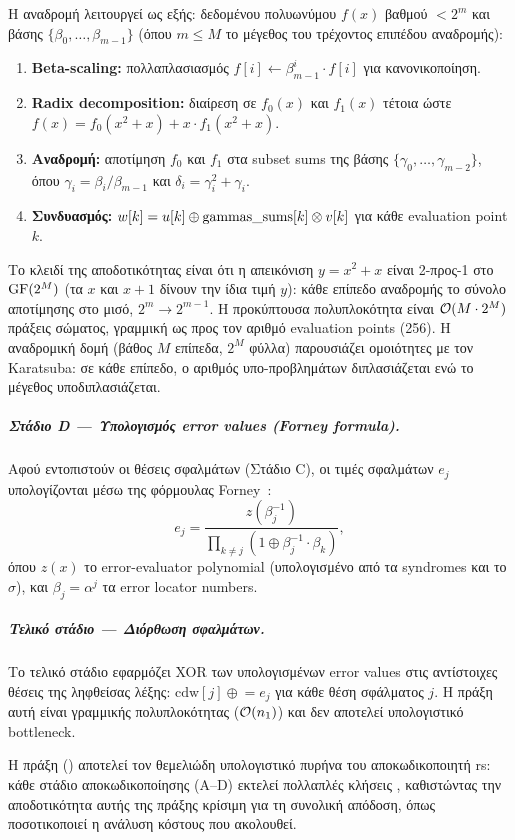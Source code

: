 Η αναδρομή λειτουργεί ως εξής: δεδομένου πολυωνύμου $f(x)$ βαθμού $< 2^m$
και βάσης $\{\beta_0, \ldots, \beta_{m-1}\}$ (όπου $m \leq M$ το μέγεθος του τρέχοντος επιπέδου αναδρομής):
\begin{enumerate}
  \item \textbf{Beta-scaling:} πολλαπλασιασμός $f[i] \leftarrow
    \beta_{m-1}^i \cdot f[i]$ για κανονικοποίηση.
  \item \textbf{Radix decomposition:} διαίρεση σε $f_0(x)$ και $f_1(x)$
    τέτοια ώστε $f(x) = f_0(x^2 + x) + x \cdot f_1(x^2 + x)$.
  \item \textbf{Αναδρομή:} αποτίμηση $f_0$ και $f_1$ στα subset sums
    της βάσης $\{\gamma_0, \ldots, \gamma_{m-2}\}$, όπου
    $\gamma_i = \beta_i / \beta_{m-1}$ και $\delta_i = \gamma_i^2 + \gamma_i$.
  \item \textbf{Συνδυασμός:} $w[k] = u[k] \oplus \text{gammas\_sums}[k] \otimes v[k]$
    για κάθε evaluation point $k$.
\end{enumerate}
Το κλειδί της αποδοτικότητας είναι ότι η απεικόνιση $y = x^2 + x$ είναι 2-προς-1 στο $\mathrm{GF}(2^M)$ (τα $x$ και $x{+}1$ δίνουν την ίδια τιμή $y$): κάθε επίπεδο αναδρομής  το σύνολο αποτίμησης στο μισό, $2^m \to 2^{m-1}$.
Η προκύπτουσα πολυπλοκότητα είναι $\mathcal{O}(M \cdot 2^M)$ πράξεις σώματος, γραμμική ως
προς τον αριθμό evaluation points (256).
Η αναδρομική δομή (βάθος $M$ επίπεδα, $2^M$ φύλλα) παρουσιάζει ομοιότητες
με τον Karatsuba: σε κάθε επίπεδο, ο
αριθμός υπο-προβλημάτων διπλασιάζεται ενώ το μέγεθος υποδιπλασιάζεται.

\subparagraph{Στάδιο D — Υπολογισμός error values (Forney formula).}
Αφού εντοπιστούν οι θέσεις σφαλμάτων (Στάδιο C), οι τιμές σφαλμάτων
$e_j$ υπολογίζονται μέσω της φόρμουλας Forney~\cite{Forney1965}:
\begin{equation}
  e_j = \frac{z(\beta_j^{-1})}{\prod_{k \neq j} (1 \oplus \beta_j^{-1} \cdot \beta_k)},
\end{equation}
όπου $z(x)$ το error-evaluator polynomial (υπολογισμένο από τα syndromes
και το $\sigma$), και $\beta_j = \alpha^{j}$ τα error locator numbers.

\subparagraph{Τελικό στάδιο — Διόρθωση σφαλμάτων.}
Το τελικό στάδιο εφαρμόζει XOR των υπολογισμένων error values στις
αντίστοιχες θέσεις της ληφθείσας λέξης:
$\text{cdw}[j] \mathrel{\oplus}= e_j$ για κάθε θέση σφάλματος $j$.
Η πράξη αυτή είναι γραμμικής πολυπλοκότητας ($\mathcal{O}(n_1)$) και δεν
αποτελεί υπολογιστικό bottleneck.

Η πράξη  (\polymul) αποτελεί τον θεμελιώδη υπολογιστικό πυρήνα του
αποκωδικοποιητή \gls{rs}: κάθε στάδιο αποκωδικοποίησης (A–D) εκτελεί πολλαπλές
κλήσεις , καθιστώντας την αποδοτικότητα αυτής της πράξης κρίσιμη
για τη συνολική απόδοση, όπως ποσοτικοποιεί η ανάλυση κόστους που ακολουθεί.


